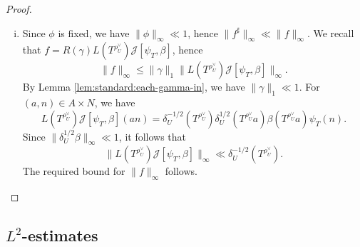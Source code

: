 \begin{proof}
\begin{enumerate}[(i)]
  \item
    Since $\phi$ is fixed, we have $\|\phi \|_\infty \ll 1$, hence $\|f^\sharp \| _\infty \ll \|f\| _\infty$.  We recall that $f =  R(\gamma) L(T^{\rho_U^\vee }) \mathcal{J}[\psi_T, \beta]$, hence
    \begin{equation*}
      \|f\|_\infty \leq \|\gamma\|_1 \|L(T^{\rho_U^\vee }) \mathcal{J}[\psi_T, \beta]\|_{\infty}.
    \end{equation*}
    By Lemma \ref{lem:standard:each-gamma-in}, we have $\|\gamma \|_1 \ll 1$.  For $(a,n) \in A \times N$, we have
    \begin{equation*}
      L(T^{\rho_U^\vee}) \mathcal{J}[\psi_T,\beta](a n)
      =
      \delta_U^{-1/2}(T^{\rho_U^\vee})  \delta_U^{1/2}(T^{\rho_U^\vee} a) \beta(T^{\rho_U^\vee} a) \psi_T(n).
    \end{equation*}
    Since $\|\delta_U^{1/2} \beta \|_{\infty} \ll 1$, it follows that
    \begin{equation*}
      \|L(T^{\rho_U^\vee}) \mathcal{J}[\psi_T,\beta]\|_{\infty} \ll \delta_U^{-1/2}(T^{\rho_U^\vee}).
    \end{equation*}
    The required bound for $\|f\|_\infty$ follows.
  \end{enumerate}

\end{proof}

\subsection{$L^2$-estimates}

